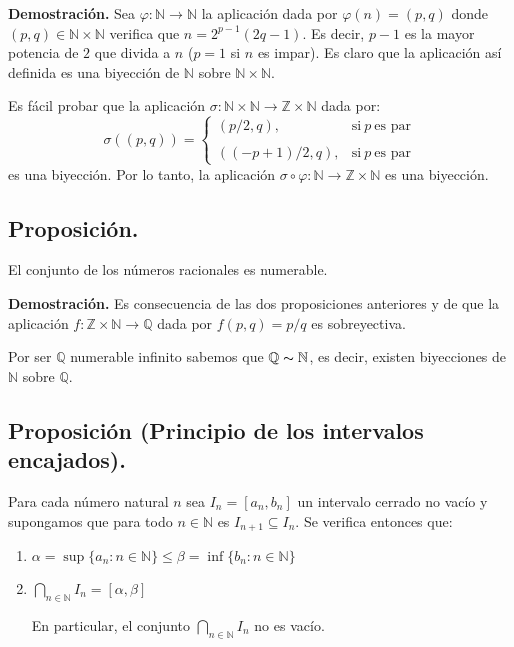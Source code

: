 \documentclass[10pt,a4paper]{article}
\begin{document}
	\textbf{Demostración.} Sea $\varphi: \mathbb{N} \rightarrow \mathbb{N}$ la aplicación dada por $\varphi(n) = (p, q)$ donde $(p, q) \in \mathbb{N} \times \mathbb{N}$ verifica que $n = 2^{p-1}(2q-1)$. Es decir, $p-1$ es la mayor potencia de $2$ que divida a $n$ ($ p = 1$ si $n$ es impar). Es claro que la aplicación así definida es una biyección de $\mathbb{N}$ sobre $\mathbb{N} \times \mathbb{N}$.
	
	Es fácil probar que la aplicación $\sigma: \mathbb{N} \times \mathbb{N} \rightarrow \mathbb{Z} \times \mathbb{N}$ dada por:
	$$\sigma((p, q)) = \left\{ \begin{array}{lcc}
		(p/2, q), &   \text{si}~p~\text{es par} \\
		\\ ((-p+1)/2, q), &  \text{si}~p~\text{es par}
	\end{array}
	\right.$$
	es una biyección. Por lo tanto, la aplicación $\sigma \circ \varphi : \mathbb{N} \rightarrow \mathbb{Z} \times \mathbb{N}$ es una biyección.
	
	\subsection{Proposición.}
	El conjunto de los números racionales es numerable.
	
	\textbf{Demostración.} Es consecuencia de las dos proposiciones anteriores y de que la aplicación $f: \mathbb{Z} \times \mathbb{N} \rightarrow \mathbb{Q}$ dada por $f(p, q) = p/q$ es sobreyectiva.
	
	Por ser $\mathbb{Q}$ numerable infinito sabemos que $\mathbb{Q} \thicksim \mathbb{N}$, es decir, existen biyecciones de $\mathbb{N}$ sobre $\mathbb{Q}$. 
	
	\subsection{Proposición (Principio de los intervalos encajados).}
	
	Para cada número natural $n$ sea $I_n = \left[a_n, b_n\right]$ un intervalo cerrado no vacío y supongamos que para todo $n \in \mathbb{N}$ es $I_{n+1} \subseteq I_n$. Se verifica entonces que:
	
	\begin{enumerate}[label=\roman*)]
		\item $\alpha = \sup\{a_n : n \in \mathbb{N}\} \leq \beta = \inf\{b_n : n \in \mathbb{N}\}$
		\item $\displaystyle\bigcap_{n \in \mathbb{N}}I_n = \left[\alpha, \beta\right]$
		
		En particular, el conjunto $\displaystyle \bigcap_{n \in \mathbb{N}}I_n$ no es vacío.
	\end{enumerate}
\end{document}
